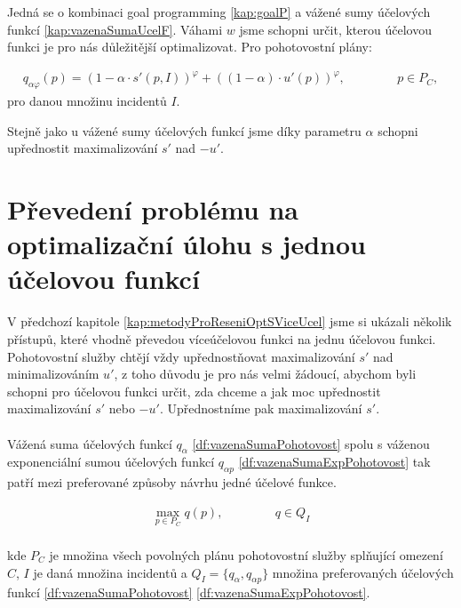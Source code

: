 Jedná se o kombinaci goal programming \ref{kap:goalP} a vážené sumy účelových funkcí \ref{kap:vazenaSumaUcelF}.
Váhami $w$ jsme schopni určit, kterou účelovou funkci je pro nás důležitější optimalizovat. Pro pohotovostní plány:

\begin{definice}\label{df:vazenaSumaExpPohotovost}
  \begin{align*}
    q_{\alpha \varphi}(p) = (1 - \alpha \cdot s'(p, I))^\varphi + ((1 - \alpha) \cdot u'(p))^\varphi, \hspace{50pt} p \in P_C,
  \end{align*}
  pro danou množinu incidentů $I$.
  \\ 
\end{definice}

Stejně jako u vážené sumy účelových funkcí jsme díky parametru $\alpha$ schopni upřednostit maximalizování $s'$ nad $-u'$.

\section{Převedení problému na optimalizační úlohu s jednou účelovou funkcí}\label{kap:opt1Uc}

V předchozí kapitole \ref{kap:metodyProReseniOptSViceUcel} jsme si ukázali několik přístupů, které vhodně převedou víceúčelovou funkci na jednu účelovou funkci.
Pohotovostní služby chtějí vždy upřednostňovat maximalizování $s'$ nad minimalizováním $u'$,
z toho důvodu je pro nás velmi žádoucí, abychom byli schopni pro účelovou funkci určit, zda chceme a jak moc upřednostit maximalizování $s'$ nebo $-u'$.
Upřednostníme pak maximalizování $s'$.
\\
\\
Vážená suma účelových funkcí $q_{\alpha}$ \ref{df:vazenaSumaPohotovost} spolu s
váženou exponenciální sumou účelových funkcí $q_{\alpha p}$ \ref{df:vazenaSumaExpPohotovost} tak patří mezi preferované způsoby návrhu jedné účelové funkce.

\begin{definice}\label{df:optUloha1uc}
  \begin{align*}
    \max_{p \in P_C} q(p), \hspace{50pt} q \in Q_I
  \end{align*}
  \\
  kde $P_C$ je množina všech povolných plánu pohotovostní služby splňující omezení $C$, $I$ je daná množina incidentů
  a $Q_I = \{ q_{\alpha}, q_{\alpha p}\}$ množina preferovaných účelových funkcí \ref{df:vazenaSumaPohotovost} \ref{df:vazenaSumaExpPohotovost}.
\end{definice}

